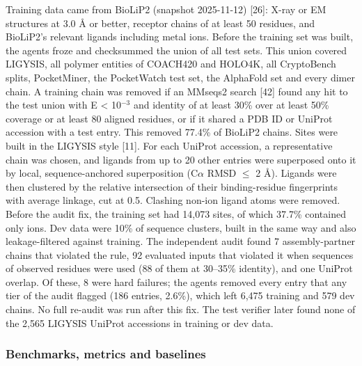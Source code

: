 \documentclass[10pt,letterpaper]{article}
\begin{document}
Training data came from BioLiP2 (snapshot 2025-11-12) [26]: X-ray or EM structures at 3.0 \AA{} or better, receptor chains of at least 50 residues, and BioLiP2's relevant ligands including metal ions. Before the training set was built, the agents froze and checksummed the union of all test sets. This union covered LIGYSIS, all polymer entities of COACH420 and HOLO4K, all CryptoBench splits, PocketMiner, the PocketWatch test set, the AlphaFold set and every dimer chain. A training chain was removed if an MMseqs2 search [42] found any hit to the test union with E \textless{} 10$^{-3}$ and identity of at least 30\% over at least 50\% coverage or at least 80 aligned residues, or if it shared a PDB ID or UniProt accession with a test entry. This removed 77.4\% of BioLiP2 chains. Sites were built in the LIGYSIS style [11]. For each UniProt accession, a representative chain was chosen, and ligands from up to 20 other entries were superposed onto it by local, sequence-anchored superposition (C$\alpha$ RMSD $\le$ 2 \AA{}). Ligands were then clustered by the relative intersection of their binding-residue fingerprints with average linkage, cut at 0.5. Clashing non-ion ligand atoms were removed. Before the audit fix, the training set had 14,073 sites, of which 37.7\% contained only ions. Dev data were 10\% of sequence clusters, built in the same way and also leakage-filtered against training. The independent audit found 7 assembly-partner chains that violated the rule, 92 evaluated inputs that violated it when sequences of observed residues were used (88 of them at 30--35\% identity), and one UniProt overlap. Of these, 8 were hard failures; the agents removed every entry that any tier of the audit flagged (186 entries, 2.6\%), which left 6,475 training and 579 dev chains. No full re-audit was run after this fix. The test verifier later found none of the 2,565 LIGYSIS UniProt accessions in training or dev data.

\subsubsection*{Benchmarks, metrics and baselines}
\end{document}
